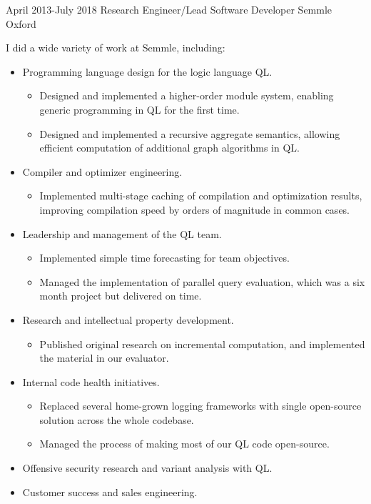 \documentclass[12pt,a4paper,sans]{moderncv}
\begin{document}
\cventry
{April 2013-July 2018}
{Research Engineer/Lead Software Developer}
{Semmle}
{Oxford}
{}
{
  I did a wide variety of work at Semmle, including:
  \begin{itemize}
    \item Programming language design for the logic language QL.
      \begin{itemize}
      \item Designed and implemented a higher-order module system, enabling generic programming in QL
          for the first time.
      \item Designed and implemented a recursive aggregate semantics, allowing efficient computation of
          additional graph algorithms in QL.
      \end{itemize}
    \item Compiler and optimizer engineering.
      \begin{itemize}
      \item Implemented multi-stage caching of compilation and optimization results,
          improving compilation speed by orders of magnitude in common cases.
      \end{itemize}
    \item Leadership and management of the QL team.
      \begin{itemize}
      \item Implemented simple time forecasting for team objectives.
      \item Managed the implementation of parallel query evaluation, which was a
        six month project but delivered on time.
      \end{itemize}
    \item Research and intellectual property development.
      \begin{itemize}
      \item Published original research on incremental computation, and implemented
          the material in our evaluator.
      \end{itemize}
    \item Internal code health initiatives.
      \begin{itemize}
      \item Replaced several home-grown logging frameworks with single open-source
        solution across the whole codebase.
      \item Managed the process of making most of our QL code open-source.
      \end{itemize}
    \item Offensive security research and variant analysis with QL.
    \item Customer success and sales engineering.
  \end{itemize}
}
\end{document}

